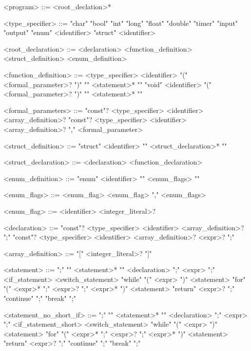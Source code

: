 \begin{grammar}
 
 
 
 
 <program> ::= <root\_declation>*
 
 <type\_specifier> ::= "char"
 \alt "bool"
 \alt "int"
 \alt "long"
 \alt "float"
 \alt "double"
 \alt "timer"
 \alt "input"
 \alt "output"
 \alt "enum" <identifier>
 \alt "struct" <identifier>
 
 <root\_declaration> ::= <declaration>
 \alt <function\_definition>
 \alt <struct\_definition>
 \alt <enum\_definition>
 
 <function\_definition> ::= <type\_specifier> <identifier> "(" <formal\_parameter>? ")" "{" <statement>* "}"
 \alt "void" <identifier> "(" <formal\_parameter>? ")" "{" <statement>* "}"
 
 <formal\_parameters> ::= "const"? <type\_specifier> <identifier> <array\_definition>?
 \alt "const"? <type\_specifier> <identifier> <array\_definition>? "," <formal\_parameter>
 
 <struct\_definition> ::= "struct" <identifier> "{" <struct\_declaration>* "}"
 
 <struct\_declaration> ::= <declaration>
 \alt <function\_declaration>
 
 <enum\_definition> ::= "enum" <identifier> "{" <enum\_flags> "}"
 
 <enum\_flags> ::= <enum\_flag>
 \alt <enum\_flag> "," <enum\_flags>
 
 <enum\_flag> ::= <identifier> <integer\_literal>?
 
 
 <declaration> ::= "const"? <type\_specifier> <identifier> <array\_definition>? ";"
 \alt "const"? <type\_specifier> <identifier> <array\_definition>? <expr>? ";"
 
 <array\_definition> ::= "[" <integer\_literal>? "]"
 
 <statement> ::= ";"
 \alt "{" <statement>* "}"
 \alt <declaration> ";"
 \alt <expr> ";"
 \alt <if\_statement>
 \alt <switch\_statement>
 \alt "while" "(" <expr> ")" <statement>
 \alt "for" "(" <expr>* ";" <expr>? ";" <expr>* ")" <statement>
 \alt "return" <expr>? ";"
 \alt "continue" ";"
 \alt "break" ";"
 
 <statement\_no\_short\_if> ::= ";"
 \alt "{" <statement>* "}"
 \alt <declaration> ";"
 \alt <expr> ";"
 \alt <if\_statement\_short>
 \alt <switch\_statement>
 \alt "while" "(" <expr> ")" <statement>
 \alt "for" "(" <expr>* ";" <expr>? ";" <expr>* ")" <statement>
 \alt "return" <expr>? ";"
 \alt "continue" ";"
 \alt "break" ";"
 

\end{grammar}
